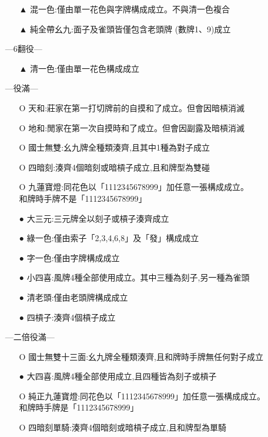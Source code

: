 \documentclass[a4paper,12pt]{article}
\begin{document}
\begin{itemize}
\begin{itemize}
        \item[▲] 混一色:僅由單一花色與字牌構成成立。不與清一色複合
        \item[▲] 純全帶幺九:面子及雀頭皆僅包含老頭牌 (數牌1、9)成立
    \end{itemize}
    \item[] ---6翻役---
    \begin{itemize}
        \item[▲] 清一色:僅由單一花色構成成立
    \end{itemize}
    \item[] ---役滿---
    \begin{itemize}
        \item[O] 天和:莊家在第一打切牌前的自摸和了成立。但會因暗槓消滅
        \item[O] 地和:閒家在第一次自摸時和了成立。但會因副露及暗槓消滅
        \item[O] 國士無雙:幺九牌全種類湊齊,且其中1種為對子成立
        \item[O] 四暗刻:湊齊4個暗刻或暗槓子成立,且和牌型為雙碰
        \item[O] 九蓮寶燈:同花色以「1112345678999」加任意一張構成成立。 \\
        和牌時手牌不是「1112345678999」 
        \item[●] 大三元:三元牌全以刻子或槓子湊齊成立
        \item[●] 綠一色:僅由索子「2,3,4,6,8」及「發」構成成立
        \item[●] 字一色:僅由字牌構成成立
        \item[●] 小四喜:風牌4種全部使用成立。其中三種為刻子,另一種為雀頭
        \item[●] 清老頭:僅由老頭牌構成成立
        \item[●] 四槓子:湊齊4個槓子成立
    \end{itemize}
    \item[] ---二倍役滿---
    \begin{itemize}
        \item[O] 國士無雙十三面:幺九牌全種類湊齊,且和牌時手牌無任何對子成立
        \item[●] 大四喜:風牌4種全部使用成立,且四種皆為刻子或槓子
        \item[O] 純正九蓮寶燈:同花色以「1112345678999」加任意一張構成成立。 \\
        和牌時手牌是「1112345678999」
        \item[O] 四暗刻單騎:湊齊4個暗刻或暗槓子成立,且和牌型為單騎
    \end{itemize}

\end{itemize}
\end{document}
